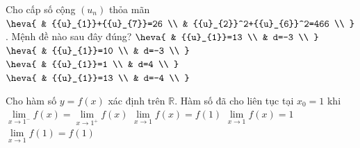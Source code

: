 \begin{ex}%
	Cho cấp số cộng $({{u}_{n}})$ thỏa mãn $\heva{ 
	 & {{u}_{1}}+{{u}_{7}}=26 \\
	& {{u}_{2}}^2+{{u}_{6}}^2=466  \\
	}$. Mệnh đề nào sau  đây đúng?
	\choice 
		{ $\heva{ 
		&  {{u}_{1}}=13 \\
		 & d=-3 \\
		 }$}
		{  $\heva{
		&  {{u}_{1}}=10 \\
		& d=-3  \\
		}$} 
		{  \True $\heva{
		 & {{u}_{1}}=1 \\
		 & d=4 \\
		 }$}
		{  $\heva{
		&  {{u}_{1}}=13 \\
		 & d=-4 \\
		 }$}
\end{ex}

\begin{ex}%
	Cho hàm số $y=f(x)$ xác định  trên $\mathbb{R}$. Hàm số đã cho liên tục tại $x_0=1$ khi
	\choice 
		{$\displaystyle  \lim\limits_{x\to 1^{-}}f(x)=\displaystyle \lim\limits_{x\to 1^{+}}f(x)$}
		{\True $\displaystyle  \lim\limits_{x\to 1}f(x)=f(1)$}
		{$\displaystyle  \lim\limits_{x\to 1}f(x)=1$}
		{$\displaystyle \lim\limits_{x\to  1}f(1)=f(1)$}
\end{ex}

